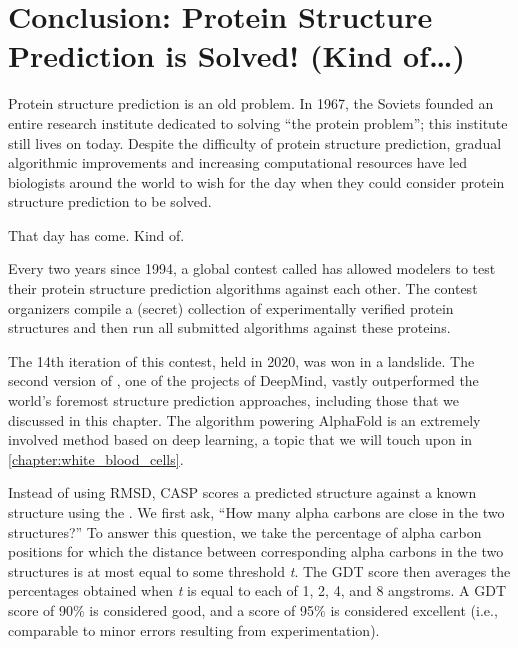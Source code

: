 \FloatBarrier
{}

\section{Conclusion: Protein Structure Prediction is Solved! (Kind of\ldots)}
\label{sec:conclusion_part_1}

Protein structure prediction is an old problem. In 1967, the Soviets founded an entire research institute dedicated to solving ``the protein problem''; this institute still lives on today. Despite the difficulty of protein structure prediction, gradual algorithmic improvements and increasing computational resources have led biologists around the world to wish for the day when they could consider protein structure prediction to be solved.

That day has come. Kind of.

Every two years since 1994, a global contest called  has allowed modelers to test their protein structure prediction algorithms against each other. The contest organizers compile a (secret) collection of experimentally verified protein structures and then run all submitted algorithms against these proteins.

The 14th iteration of this contest, held in 2020, was won in a landslide. The second version of \href{https://bit.ly/3sKl6pH}{}, one of the projects of DeepMind, vastly outperformed the world's foremost structure prediction approaches, including those that we discussed in this chapter. The algorithm powering AlphaFold is an extremely involved method based on deep learning, a topic that we will touch upon in \autoref{chapter:white_blood_cells}.

Instead of using RMSD, CASP scores a predicted structure against a known structure using the . We first ask, ``How many alpha carbons are close in the two structures?'' To answer this question, we take the percentage of alpha carbon positions for which the distance between corresponding alpha carbons in the two structures is at most equal to some threshold \textit{t}. The GDT score then averages the percentages obtained when \textit{t} is equal to each of 1, 2, 4, and 8 angstroms. A GDT score of 90\% is considered good, and a score of 95\% is considered excellent (i.e., comparable to minor errors resulting from experimentation).

